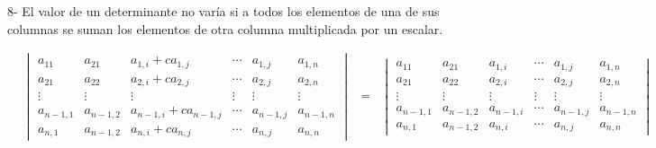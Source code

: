 \documentclass[
]{article}
\begin{document}
8- El valor de un determinante no varía si a todos los elementos de una
de sus columnas se suman los elementos de otra columna multiplicada por
un escalar.

\begin{equation}
\begin{array}{cccc}
 &  \begin{vmatrix} 
     a_{11}     & a_{21}      & a_{1,i}  + ca_{1,j}     & \cdots  &  a_{1,j}   & a_{1,n}      \\ 
     a_{21}     & a_{22}      & a_{2,i}  + ca_{2,j}     & \cdots  &  a_{2,j}   & a_{2,n}      \\
    \vdots      & \vdots      &  \vdots                  & \vdots &  \vdots    &  \vdots      \\
     a_{n-1,1}  & a_{n-1,2}   & a_{n-1,i}+ ca_{n-1,j}    & \cdots &  a_{n-1,j} & a_{n-1,n}    \\
     a_{n,1}    &  a_{n-1,2}  & a_{n,i}  + ca_{n,j}      & \cdots &  a_{n,j}   & a_{n,n}
  \end{vmatrix} & = &
  \begin{vmatrix} 
     a_{11}     & a_{21}      & a_{1,i}      & \cdots   &  a_{1,j}    & a_{1,n}      \\ 
     a_{21}     & a_{22}      & a_{2,i}      & \cdots   &  a_{2,j}    & a_{2,n}      \\
    \vdots      & \vdots      &  \vdots      & \vdots   &  \vdots     & \vdots       \\
     a_{n-1,1}  & a_{n-1,2}   & a_{n-1,i}    & \cdots   &  a_{n-1,j}  & a_{n-1,n}    \\
     a_{n,1}    & a_{n-1,2}   & a_{n,i}      & \cdots   &  a_{n,j}    & a_{n,n}
  \end{vmatrix} 
\end{array}
\end{equation}
\end{document}
